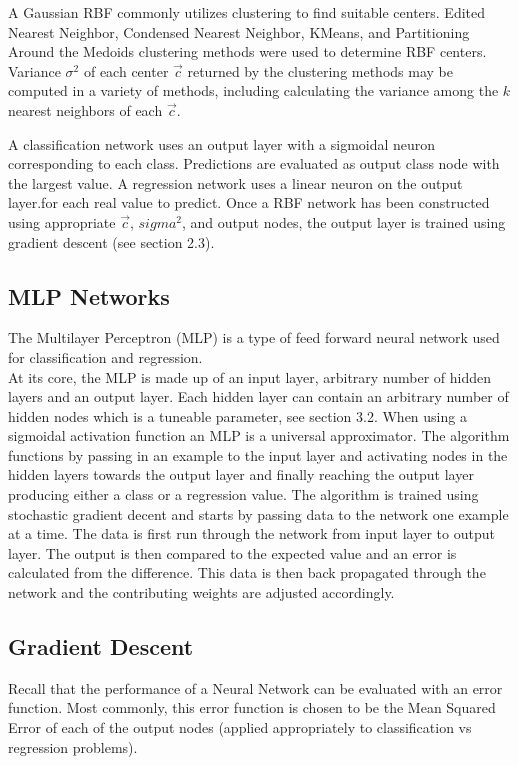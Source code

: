 \documentclass[twoside,11pt]{article}
\begin{document}
	A Gaussian RBF commonly utilizes clustering to find suitable centers. Edited Nearest Neighbor, Condensed Nearest Neighbor, KMeans, and Partitioning Around the Medoids clustering methods were used to determine RBF centers. Variance $\sigma^2$ of each center $\vec c$ returned by the clustering methods may be computed in a variety of methods, including calculating the variance among the $k$ nearest neighbors of each $\vec c$. 
	
	A classification network uses an output layer with a sigmoidal neuron corresponding to each class. Predictions are evaluated as output class node with the largest value. A regression network uses a linear neuron on the output layer.for each real value to predict. Once a RBF network has been constructed using appropriate $\vec c$, $sigma^2$, and output nodes, the output layer is trained using gradient descent (see section 2.3). 
	

\subsection{MLP Networks}
The Multilayer Perceptron (MLP) is a type of feed forward neural network used for classification and regression. \\
\indent At its core, the MLP is made up of an input layer, arbitrary number of hidden layers and an output layer. Each hidden layer can contain an arbitrary number of hidden nodes which is a tuneable parameter, see section 3.2.  When using a sigmoidal activation function an MLP is a universal approximator. The algorithm functions by passing in an example to the input layer and activating nodes in the hidden layers towards the output layer and finally reaching the output layer producing either a class or a regression value. The algorithm is trained using stochastic gradient decent and starts by passing data to the network one example at a time. The data is first run through the network from input layer to output layer. The output is then compared to the expected value and an error is calculated from the difference. This data is then back propagated through the network and the contributing weights are adjusted accordingly. 
\subsection{Gradient Descent}
Recall that the performance of a Neural Network can be evaluated with an error function.
Most commonly, this error function is chosen to be the Mean Squared Error of each of the output nodes (applied appropriately to classification vs regression problems).
\end{document}
